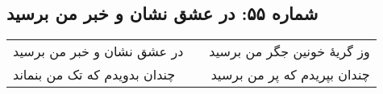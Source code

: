 \begin{center}
\section*{شماره ۵۵: در عشق نشان و خبر من برسید}
\label{sec:055}
\begin{longtable}{l p{0.5cm} r}
در عشق نشان و خبر من برسید
&&
وز گریهٔ خونین جگر من برسید
\\
چندان بدویدم که تک من بنماند
&&
چندان بپریدم که پر من برسید
\\
\end{longtable}
\end{center}
